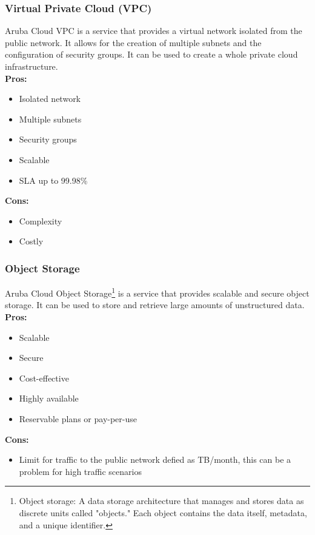     \subsubsection{Virtual Private Cloud (VPC)}
    \label{aruba-cloud:vpc}
 Aruba Cloud VPC is a service that provides a virtual network isolated from the public network. It allows for the creation of multiple subnets and the configuration of security groups. It can be used to create a whole private cloud infrastructure.\\
    \textbf{Pros:}
    \begin{itemize}
        \item Isolated network
        \item Multiple subnets
        \item Security groups
        \item Scalable
        \item SLA up to 99.98\%
    \end{itemize}
    \textbf{Cons:}
    \begin{itemize}
        \item Complexity
        \item Costly
    \end{itemize}

    \subsubsection{Object Storage}
    \label{aruba-cloud:object-storage}
 Aruba Cloud Object Storage\footnote{Object storage: A data storage architecture that manages and stores data as discrete units called "objects." Each object contains the data itself, metadata, and a unique identifier.} is a service that provides scalable and secure object storage. It can be used to store and retrieve large amounts of unstructured data.\\
    \textbf{Pros:}
    \begin{itemize}
        \item Scalable
        \item Secure
        \item Cost-effective
        \item Highly available
        \item Reservable plans or pay-per-use
    \end{itemize}
    \textbf{Cons:}
    \begin{itemize}
        \item Limit for traffic to the public network defied as TB/month, this can be a problem for high traffic scenarios
    \end{itemize}

